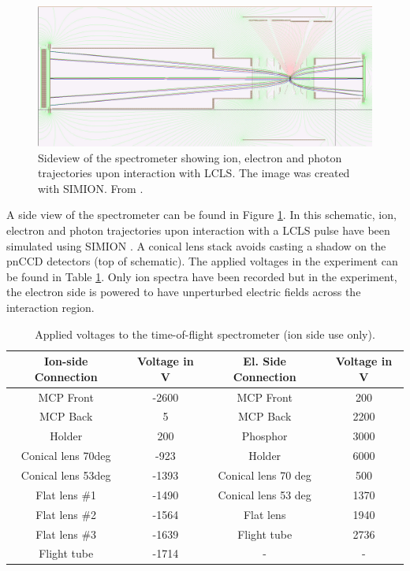 \begin{figure}
   \includegraphics[width=1.\linewidth]{images/simion.jpg}
    \caption[Sideview of the spectrometer showing ion, electron and photon trajectories.]{Sideview of the spectrometer showing ion, electron and photon trajectories upon interaction with LCLS. The image was created with SIMION. From \cite{Osipov-2013-PC}.}
\label{fig:simion}
\end{figure}
A side view of the spectrometer can be found in Figure \ref{fig:simion}. In this schematic, ion, electron and photon trajectories upon interaction with a LCLS pulse have been simulated using SIMION \cite{Osipov-2013-PC}. A conical lens stack avoids casting a shadow on the pnCCD detectors (top of schematic). The applied voltages in the experiment can be found in Table \ref{tab:tof-volategs}. Only ion spectra have been recorded but in the experiment, the electron side is powered to have unperturbed electric fields across the interaction region.
%
\begin{table}
\centering
\begin{tabular}{ | c | c || c | c | }
\hline
	\textbf{Ion-side Connection} & \textbf{Voltage in V} & \textbf{El. Side Connection} & \textbf{Voltage in V} \\ \hline
	MCP Front & -2600 & MCP Front & 200 \\ \hline
	MCP Back & 5 & MCP Back & 2200 \\ \hline
	Holder & 200 & Phosphor & 3000 \\ \hline
	Conical lens 70deg & -923 & Holder & 6000 \\ \hline
	Conical lens 53deg & -1393 & Conical lens 70 deg & 500 \\ \hline
	Flat lens \#1 & -1490 & Conical lens 53 deg & 1370 \\ \hline
	Flat lens \#2 & -1564 & Flat lens & 1940 \\ \hline
	Flat lens \#3 & -1639 & Flight tube & 2736 \\ \hline
	Flight tube & -1714 & - & - \\ \hline
\end{tabular}
\caption{Applied voltages to the time-of-flight spectrometer (ion side use only).}
\label{tab:tof-volategs}
\end{table}
%
%
%
